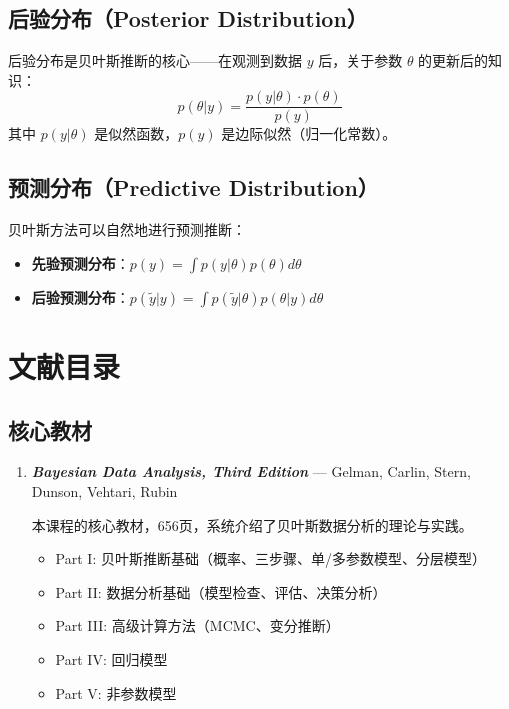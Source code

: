 \subsection{后验分布（Posterior Distribution）}

后验分布是贝叶斯推断的核心——在观测到数据 $y$ 后，关于参数 $\theta$ 的更新后的知识：
\[
p(\theta|y) = \frac{p(y|\theta) \cdot p(\theta)}{p(y)}
\]
其中 $p(y|\theta)$ 是似然函数，$p(y)$ 是边际似然（归一化常数）。

\subsection{预测分布（Predictive Distribution）}

贝叶斯方法可以自然地进行预测推断：
\begin{itemize}
  \item \textbf{先验预测分布}：$p(y) = \int p(y|\theta) p(\theta) d\theta$
  \item \textbf{后验预测分布}：$p(\tilde{y}|y) = \int p(\tilde{y}|\theta) p(\theta|y) d\theta$
\end{itemize}

\section{文献目录}\label{sec:literature}

\subsection{核心教材}

\begin{enumerate}
  \item \textbf{\textit{Bayesian Data Analysis, Third Edition}} — Gelman, Carlin, Stern, Dunson, Vehtari, Rubin

  本课程的核心教材，656页，系统介绍了贝叶斯数据分析的理论与实践。

  \begin{itemize}
    \item Part I: 贝叶斯推断基础（概率、三步骤、单/多参数模型、分层模型）
    \item Part II: 数据分析基础（模型检查、评估、决策分析）
    \item Part III: 高级计算方法（MCMC、变分推断）
    \item Part IV: 回归模型
    \item Part V: 非参数模型
  \end{itemize}
\end{enumerate}


